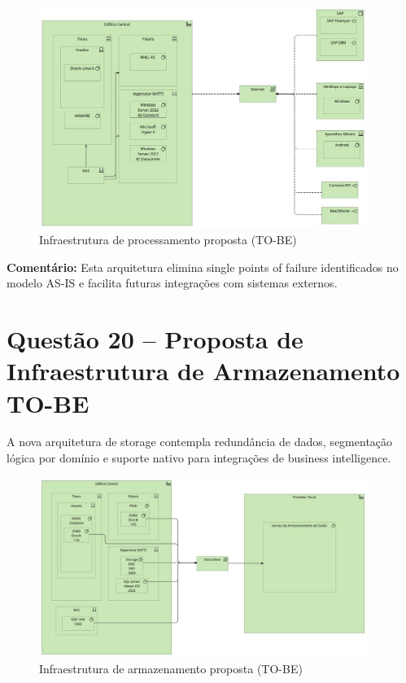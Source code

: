 \documentclass[12pt,a4paper,final]{article}
\begin{document}
    \begin{figure}[H]
        \centering
        \includegraphics[width=0.95\textwidth]{Q19 - Processing Infraestructure Proposal.jpg}
        \caption{Infraestrutura de processamento proposta (TO-BE)}
        \label{fig:q19-processing-tobe}
    \end{figure}

    \textbf{Comentário:} Esta arquitetura elimina single points of failure identificados no modelo AS-IS e facilita futuras integrações com sistemas externos.

    \section*{Questão 20 – Proposta de Infraestrutura de Armazenamento TO-BE}

    A nova arquitetura de storage contempla redundância de dados, segmentação lógica por domínio e suporte nativo para integrações de business intelligence.

    \begin{figure}[H]
        \centering
        \includegraphics[width=0.95\textwidth]{Q20 - Storage Infraestructure Proposal.jpg}
        \caption{Infraestrutura de armazenamento proposta (TO-BE)}
        \label{fig:q20-storage-tobe}
    \end{figure}
\end{document}
